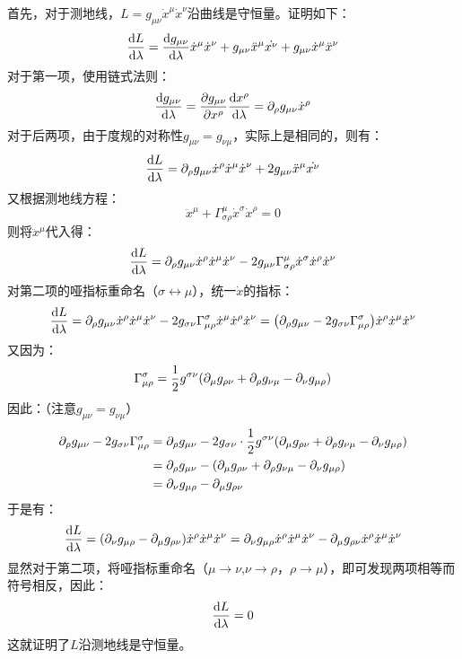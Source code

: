 \documentclass[a4paper]{article}
\begin{document}
\begin{enumerate}
\begin{enumerate}
        首先，对于测地线，$L = g_{\mu\nu} \dot{x}^\mu \dot{x}^\nu$沿曲线是守恒量。证明如下：
        \[
            \dv{L}{\lambda} = \dv{g_{\mu\nu}}{\lambda} \dot{x}^\mu \dot{x}^\nu + g_{\mu\nu} \ddot{x}^\mu \dot{x^\nu} + g_{\mu\nu} \dot{x}^\mu \ddot{x}^\nu
        \]
        对于第一项，使用链式法则：
        \[
            \dv{g_{\mu\nu}}{\lambda} = \pdv{g_{\mu\nu}}{x^\rho} \dv{x^\rho}{\lambda} = \partial_\rho g_{\mu\nu} \dot{x}^\rho
        \]
        对于后两项，由于度规的对称性$g_{\mu\nu} = g_{\nu\mu}$，实际上是相同的，则有：
        \[
            \dv{L}{\lambda} = \partial_\rho g_{\mu\nu} \dot{x}^\rho \dot{x}^\mu \dot{x}^\nu + 2g_{\mu\nu} \ddot{x}^\mu \dot{x^\nu}
        \]
        又根据测地线方程：
        \[
            \ddot{x}^\mu + \Gamma^{\mu}_{\sigma\rho} \dot{x}^\sigma \dot{x}^\rho = 0
        \]
        则将$\ddot{x}^\mu$代入得：
        \[
            \dv{L}{\lambda} = \partial_\rho g_{\mu\nu} \dot{x}^\rho \dot{x}^\mu \dot{x}^\nu - 2g_{\mu\nu} \Gamma^{\mu}_{\sigma\rho} \dot{x}^\sigma \dot{x}^\rho \dot{x}^\nu
        \]
        对第二项的哑指标重命名（$\sigma \leftrightarrow \mu$），统一$\dot{x}$的指标：
        \[
            \dv{L}{\lambda}
            = \partial_\rho g_{\mu\nu} \dot{x}^\rho \dot{x}^\mu \dot{x}^\nu - 2g_{\sigma\nu} \Gamma^{\sigma}_{\mu\rho} \dot{x}^\mu \dot{x}^\rho \dot{x}^\nu
            = \qty(\partial_\rho g_{\mu\nu} - 2g_{\sigma\nu} \Gamma^{\sigma}_{\mu\rho}) \dot{x}^\rho \dot{x}^\mu \dot{x}^\nu
        \]
        又因为：
        \[
            \Gamma^{\sigma}_{\mu\rho} = \frac{1}{2} g^{\sigma\nu} \qty(\partial_\mu g_{\rho\nu} + \partial_\rho g_{\nu\mu} - \partial_\nu g_{\mu\rho})
        \]
        因此：（注意$g_{\mu\nu} = g_{\nu\mu}$）
        \begin{align*}
            \partial_\rho g_{\mu\nu} - 2g_{\sigma\nu} \Gamma^{\sigma}_{\mu\rho}
            &= \partial_\rho g_{\mu\nu} - 2g_{\sigma\nu} \cdot \frac{1}{2} g^{\sigma\nu} \qty(\partial_\mu g_{\rho\nu} + \partial_\rho g_{\nu\mu} - \partial_\nu g_{\mu\rho}) \\
            &= \partial_\rho g_{\mu\nu} - \qty(\partial_\mu g_{\rho\nu} + \partial_\rho g_{\nu\mu} - \partial_\nu g_{\mu\rho}) \\
            &= \partial_\nu g_{\mu\rho} - \partial_\mu g_{\rho\nu}
        \end{align*}
        于是有：
        \[
            \dv{L}{\lambda} = \qty(\partial_\nu g_{\mu\rho} - \partial_\mu g_{\rho\nu}) \dot{x}^\rho \dot{x}^\mu \dot{x}^\nu = \partial_\nu g_{\mu\rho} \dot{x}^\rho \dot{x}^\mu \dot{x}^\nu - \partial_\mu g_{\rho\nu} \dot{x}^\rho \dot{x}^\mu \dot{x}^\nu
        \]
        显然对于第二项，将哑指标重命名（$\mu \to \nu$,$\nu \to \rho$，$\rho \to \mu$），即可发现两项相等而符号相反，因此：
        \[
            \dv{L}{\lambda} = 0
        \]
        这就证明了$L$沿测地线是守恒量。


\end{enumerate}
\end{enumerate}
\end{document}
